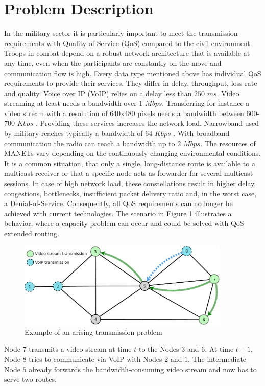 \documentclass[runningheads]{llncs}
\newcommand{\MANET}{MANET}
\newcommand{\QOS}{QoS}
\newcommand{\VOIP}{VoIP}
\begin{document}
	\section{Problem Description}
	In the military sector it is particularly important to meet the transmission requirements with Quality of Service (\QOS{}) compared to the civil environment. Troops in combat depend on a robust network architecture that is available at any time, even when the participants are constantly on the move and communication flow is high. Every data type mentioned above has individual \QOS{} requirements to provide their services. They differ in delay, throughput, loss rate and quality. Voice over IP (\VOIP{}) relies on a delay less than $250$ $ms$. Video streaming at least needs a bandwidth over $1$ $Mbps$. Transferring for instance a video stream with a resolution of $640$x$480$ pixels needs a bandwidth between $600$-$700$ $Kbps$ \cite{Video:Bandwidth}. Providing these services increases the network load. Narrowband used by military reaches typically a bandwidth of $64$ $Kbps$ \cite{military:narrowband}. With broadband communication the radio can reach a bandwidth up to $2$ $Mbps$. The resources of \MANET{s} vary depending on the continuously changing environmental conditions. It is a common situation, that only a single, long-distance route is available to a multicast receiver or that a specific node acts as forwarder for several multicast sessions. In case of high network load, these constellations result in higher delay, congestions, bottlenecks, insufficient packet delivery ratio and, in the worst case, a Denial-of-Service. Consequently, all \QOS{} requirements can no longer be achieved with current technologies. The scenario in Figure \ref{fig:multicast} illustrates a behavior, where a capacity problem can occur and could be solved with \QOS{} extended routing.
	\begin{figure}[h]
		\centering
		\includegraphics[width=0.9\textwidth]{figures/MulticastCommunicationOne.pdf}
		\caption{Example of an arising transmission problem}
		\label{fig:multicast}
	\end{figure}
	Node $7$ transmits a video stream at time $t$ to the Nodes $3$ and $6$. At time $t+1$, Node $8$ tries to communicate via \VOIP{} with Nodes $2$ and $1$. The intermediate Node $5$ already forwards the bandwidth-consuming video stream and now has to serve two routes. 
	
\end{document}
